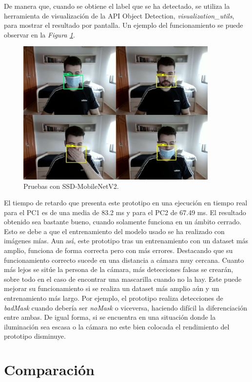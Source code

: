 De manera que, cuando se obtiene el label que se ha detectado, se utiliza la herramienta de visualización de la API Object Detection, \textit{visualization\_utils}, para mostrar el resultado por pantalla. Un ejemplo del funcionamiento se puede observar en la \textit{Figura \ref{fig:protoTensorFlow}}.

\begin{figure}[htp]
	\centering
	\includegraphics[width=10cm]{imagenes/tf_prueba.png}
	\caption{Pruebas con SSD-MobileNetV2.}
	\label{fig:protoTensorFlow}
\end{figure}

El tiempo de retardo que presenta este prototipo en una ejecución en tiempo real para el PC1 es de una media de 83.2 ms y para el PC2 de 67.49 ms. El resultado obtenido sea bastante bueno, cuando solamente funciona en un ámbito cerrado. Esto se debe a que el entrenamiento del modelo usado se ha realizado con imágenes mías. Aun así, este prototipo tras un entrenamiento con un dataset más amplio, funciona de forma correcta pero con más errores. Destacando que su funcionamiento correcto sucede en una distancia a cámara muy cercana. Cuanto más lejos se sitúe la persona de la cámara, más detecciones falsas se crearán, sobre todo en el caso de encontrar una mascarilla cuando no la hay. Este puede mejorar su funcionamiento si se realiza un dataset más amplio aún y un entrenamiento más largo. Por ejemplo, el prototipo realiza detecciones de \textit{badMask} cuando debería ser \textit{noMask} o viceversa, haciendo difícil la diferenciación entre ambas. De igual forma, si se encuentra en una situación donde la iluminación sea escasa o la cámara no este bien colocada el rendimiento del prototipo disminuye.

\newpage
\section{Comparación}
\vspace{-0.7cm}

